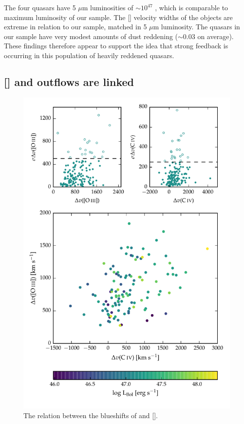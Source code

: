The four \citet{zakamska16} quasars have 5 $\mu$m luminosities of $\sim10^{47}$ \ergs, which is comparable to maximum luminosity of our sample.
The [] velocity widths of the \citet{zakamska16} objects are extreme in relation to our sample, matched in 5 $\mu$m luminosity.
The quasars in our sample have very modest amounts of dust reddening (\ebv $\sim0.03$ on average). 
These findings therefore appear to support the idea that strong feedback is occurring in this population of heavily reddened quasars. 

\subsection{[] and  outflows are linked}

\begin{figure}
    \includegraphics[width=\columnwidth]{figures/chapter04/civ_blueshift_oiii_blueshift.pdf} 
    \caption[{The relation between the blueshifts of  and [].}]{The relation between the blueshifts of  and [].}     
    \label{fig:oiii_civ_blueshifts}
\end{figure}

